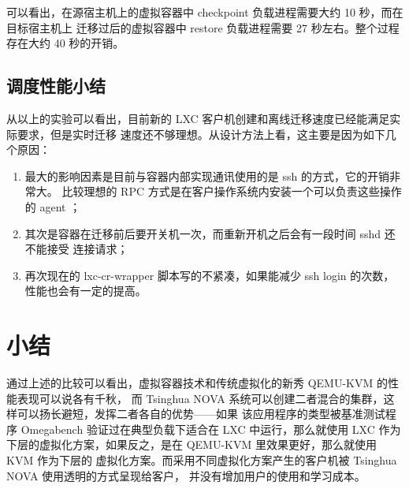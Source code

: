 可以看出，在源宿主机上的虚拟容器中 checkpoint 负载进程需要大约 10 秒，而在目标宿主机上
迁移过后的虚拟容器中 restore 负载进程需要 27 秒左右。整个过程存在大约 40 秒的开销。

\subsection{调度性能小结}

从以上的实验可以看出，目前新的 LXC 客户机创建和离线迁移速度已经能满足实际要求，但是实时迁移
速度还不够理想。从设计方法上看，这主要是因为如下几个原因：

\begin{enumerate}
    \item 最大的影响因素是目前与容器内部实现通讯使用的是 ssh 的方式，它的开销非常大。
    比较理想的 RPC 方式是在客户操作系统内安装一个可以负责这些操作的 agent ；
    \item 其次是容器在迁移前后要开关机一次，而重新开机之后会有一段时间 sshd 还不能接受
    连接请求；
    \item 再次现在的 lxc-cr-wrapper 脚本写的不紧凑，如果能减少 ssh login 的次数，
    性能也会有一定的提高。
\end{enumerate}

\section{小结}

通过上述的比较可以看出，虚拟容器技术和传统虚拟化的新秀 QEMU-KVM 的性能表现可以说各有千秋，
而 Tsinghua NOVA 系统可以创建二者混合的集群，这样可以扬长避短，发挥二者各自的优势——如果
该应用程序的类型被基准测试程序 Omegabench 验证过在典型负载下适合在 LXC 中运行，那么就使用
LXC 作为下层的虚拟化方案，如果反之，是在 QEMU-KVM 里效果更好，那么就使用 KVM 作为下层的
虚拟化方案。而采用不同虚拟化方案产生的客户机被 Tsinghua NOVA 使用透明的方式呈现给客户，
并没有增加用户的使用和学习成本。
